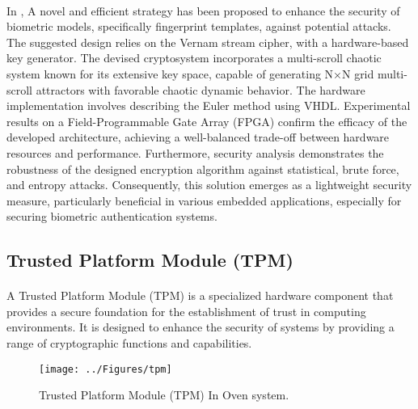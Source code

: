 \paragraph*{}
In \cite{https://doi.org/10.1002/dac.4211}, A novel and efficient strategy has been proposed to enhance the security of biometric models, specifically fingerprint templates, against potential attacks. The suggested design relies on the Vernam stream cipher, with a hardware-based key generator. The devised cryptosystem incorporates a multi-scroll chaotic system known for its extensive key space, capable of generating N×N grid multi-scroll attractors with favorable chaotic dynamic behavior. The hardware implementation involves describing the Euler method using VHDL. Experimental results on a Field-Programmable Gate Array (FPGA) confirm the efficacy of the developed architecture, achieving a well-balanced trade-off between hardware resources and performance. Furthermore, security analysis demonstrates the robustness of the designed encryption algorithm against statistical, brute force, and entropy attacks. Consequently, this solution emerges as a lightweight security measure, particularly beneficial in various embedded applications, especially for securing biometric authentication systems.
\subsection{Trusted Platform Module (TPM)}
\paragraph*{}
A Trusted Platform Module (TPM) is a specialized hardware component that provides a secure foundation for the establishment of trust in computing environments. It is designed to enhance the security of systems by providing a range of cryptographic functions and capabilities.
\begin{figure}[h]
	\centering
	\texttt{[image: ../Figures/tpm]}
	\caption{Trusted Platform Module (TPM) In Oven system.}
	\label{fig:tpm}
\end{figure}

